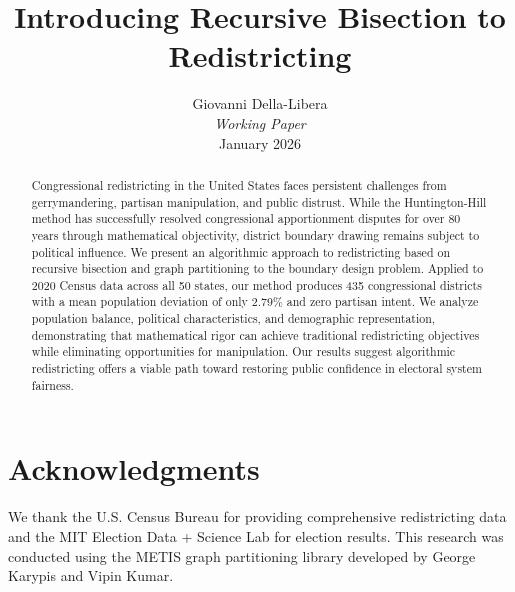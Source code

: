 \documentclass[11pt,twocolumn]{article}
\title{\textbf{Introducing Recursive Bisection to Redistricting}}
\author{
Giovanni Della-Libera\\
\textit{Working Paper}\\
January 2026
}
\date{}
\begin{document}
\maketitle

\begin{abstract}
Congressional redistricting in the United States faces persistent challenges from gerrymandering, partisan manipulation, and public distrust. While the Huntington-Hill method has successfully resolved congressional apportionment disputes for over 80 years through mathematical objectivity, district boundary drawing remains subject to political influence. We present an algorithmic approach to redistricting based on recursive bisection and graph partitioning to the boundary design problem. Applied to 2020 Census data across all 50 states, our method produces 435 congressional districts with a mean population deviation of only 2.79\% and zero partisan intent. We analyze population balance, political characteristics, and demographic representation, demonstrating that mathematical rigor can achieve traditional redistricting objectives while eliminating opportunities for manipulation. Our results suggest algorithmic redistricting offers a viable path toward restoring public confidence in electoral system fairness.
\end{abstract}








\section*{Acknowledgments}
We thank the U.S. Census Bureau for providing comprehensive redistricting data and the MIT Election Data + Science Lab for election results. This research was conducted using the METIS graph partitioning library developed by George Karypis and Vipin Kumar.



\end{document}
